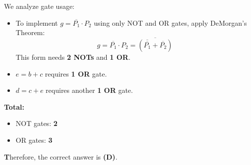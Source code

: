 \documentclass[a4paper,12pt]{article}
\begin{document}
We analyze gate usage:
\begin{itemize}
    \item To implement $g = \overline{P_1} \cdot P_2$ using only NOT and OR gates, apply DeMorgan’s Theorem: 
    \[
    g = \overline{P_1} \cdot P_2 = \overline{(\overline{\overline{P_1}} + \overline{P_2})}
    \]
    This form needs \textbf{2 NOTs} and \textbf{1 OR}.

    \item $e = b + c$ requires \textbf{1 OR} gate.

    \item $d = c + e$ requires another \textbf{1 OR} gate.
\end{itemize}

\textbf{Total:}
\begin{itemize}
    \item NOT gates: \textbf{2}
    \item OR gates: \textbf{3}
\end{itemize}

\textbf Therefore, the correct answer is \textbf{(D)}.
\end{document}
